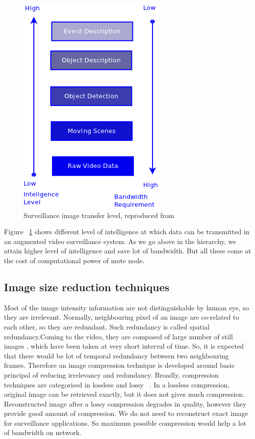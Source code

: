 \begin{figure}[!b]
\centering
\includegraphics[scale=0.80]{Figures/image_tr_level}
\caption{Surveillance image transfer level, reproduced from ~\cite{3}}
\label{image_tr_level}
\end{figure}

Figure ~\ref{image_tr_level} shows different level of intelligence at
which data can be transmitted in an augmented video surveillance
system. As we go above in the hierarchy, we attain higher level of
intelligence and save lot of bandwidth. But all these come at the cost
of computational power of mote node.

\subsection{Image size reduction techniques}
Most of the image intensity information are not distinguishable by human
eye, so they are irrelevant. Normally, neighbouring pixel of an image
are co-related to each other, so they are redundant. Such redundancy is
called spatial redundancy.Coming to the video, they are composed of
large number of still images , which have been taken at very short
interval of time. So, it is expected that there would be lot of temporal
redundancy between two neighbouring frames.  Therefore an image
compression technique is developed around basic principal of reducing
irrelevancy and redundancy. Broadly, compression techniques are
categorised in lossless and lossy ~\cite{6}. In a lossless compression, original
image can be retrieved exactly, but it does not gives much compression.
Reconstructed image after a lossy compression degrades in quality,
however they provide good amount of compression. We do not need to
reconstruct exact image for surveillance applications. So maximum
possible compression would help a lot of bandwidth on network.\\

